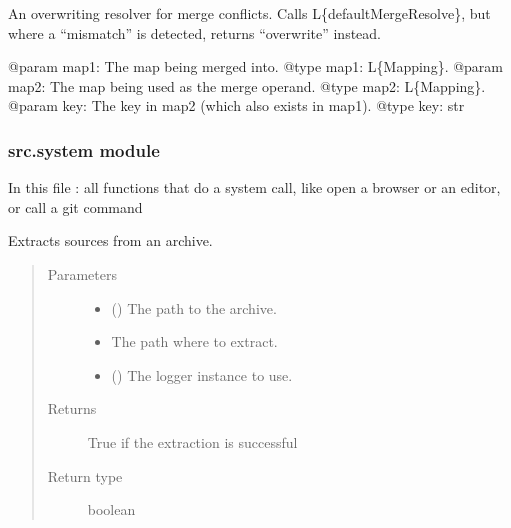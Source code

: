 \documentclass[a4paper,10pt,english]{sphinxmanual}
\begin{document}

\begin{fulllineitems}
\label{\detokenize{commands/apidoc/src:src.pyconf.overwriteMergeResolve}}
An overwriting resolver for merge conflicts. Calls L\{defaultMergeResolve\},
but where a “mismatch” is detected, returns “overwrite” instead.

@param map1: The map being merged into.
@type map1: L\{Mapping\}.
@param map2: The map being used as the merge operand.
@type map2: L\{Mapping\}.
@param key: The key in map2 (which also exists in map1).
@type key: str

\end{fulllineitems}



\subsubsection{src.system module}
\label{\detokenize{commands/apidoc/src:src-system-module}}\label{\detokenize{commands/apidoc/src:module-src.system}}
In this file : all functions that do a system call, 
like open a browser or an editor, or call a git command

\begin{fulllineitems}
\label{\detokenize{commands/apidoc/src:src.system.archive_extract}}
Extracts sources from an archive.
\begin{quote}\begin{description}
\item[{Parameters}] \leavevmode\begin{itemize}
\item {} 
 () \textendash{} The path to the archive.

\item {} 
 \textendash{} The path where to extract.

\item {} 
 () \textendash{} The logger instance to use.

\end{itemize}

\item[{Returns}] \leavevmode
True if the extraction is successful

\item[{Return type}] \leavevmode
boolean

\end{description}\end{quote}

\end{fulllineitems}
\end{document}
